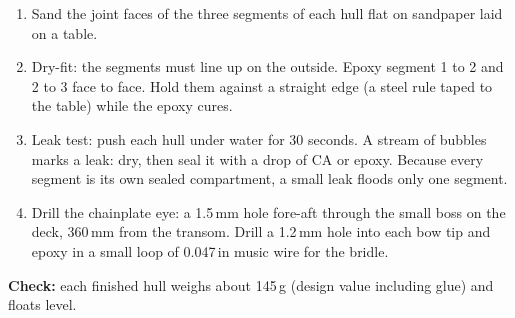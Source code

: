 \documentclass[11pt]{article}
\newcommand{\chk}[1]{\par\noindent\textbf{Check:} #1\par}
\begin{document}
\begin{enumerate}
\item Sand the joint faces of the three segments of each hull flat on sandpaper laid on a table.
\item Dry-fit: the segments must line up on the outside. Epoxy segment 1 to 2 and 2 to 3 face to face. Hold them against a straight edge (a steel rule taped to the table) while the epoxy cures.
\item Leak test: push each hull under water for 30 seconds. A stream of bubbles marks a leak: dry, then seal it with a drop of CA or epoxy. Because every segment is its own sealed compartment, a small leak floods only one segment.
\item Drill the chainplate eye: a 1.5\,mm hole fore-aft through the small boss on the deck, 360\,mm from the transom. Drill a 1.2\,mm hole into each bow tip and epoxy in a small loop of 0.047\,in music wire for the bridle.
\end{enumerate}
\chk{each finished hull weighs about 145\,g (design value including glue) and floats level.}
\end{document}
